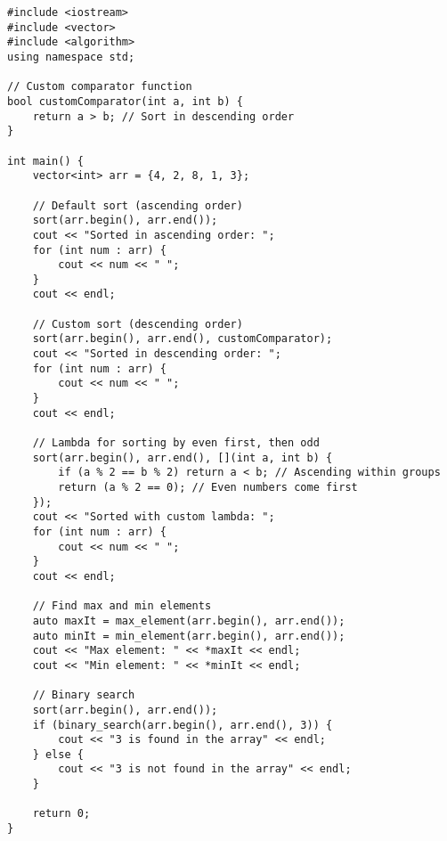 \documentclass{article}
\begin{document}
\begin{lstlisting}
#include <iostream>
#include <vector>
#include <algorithm>
using namespace std;

// Custom comparator function
bool customComparator(int a, int b) {
    return a > b; // Sort in descending order
}

int main() {
    vector<int> arr = {4, 2, 8, 1, 3};

    // Default sort (ascending order)
    sort(arr.begin(), arr.end());
    cout << "Sorted in ascending order: ";
    for (int num : arr) {
        cout << num << " ";
    }
    cout << endl;

    // Custom sort (descending order)
    sort(arr.begin(), arr.end(), customComparator);
    cout << "Sorted in descending order: ";
    for (int num : arr) {
        cout << num << " ";
    }
    cout << endl;

    // Lambda for sorting by even first, then odd
    sort(arr.begin(), arr.end(), [](int a, int b) {
        if (a % 2 == b % 2) return a < b; // Ascending within groups
        return (a % 2 == 0); // Even numbers come first
    });
    cout << "Sorted with custom lambda: ";
    for (int num : arr) {
        cout << num << " ";
    }
    cout << endl;

    // Find max and min elements
    auto maxIt = max_element(arr.begin(), arr.end());
    auto minIt = min_element(arr.begin(), arr.end());
    cout << "Max element: " << *maxIt << endl;
    cout << "Min element: " << *minIt << endl;

    // Binary search
    sort(arr.begin(), arr.end());
    if (binary_search(arr.begin(), arr.end(), 3)) {
        cout << "3 is found in the array" << endl;
    } else {
        cout << "3 is not found in the array" << endl;
    }

    return 0;
}
\end{lstlisting}
\end{document}
